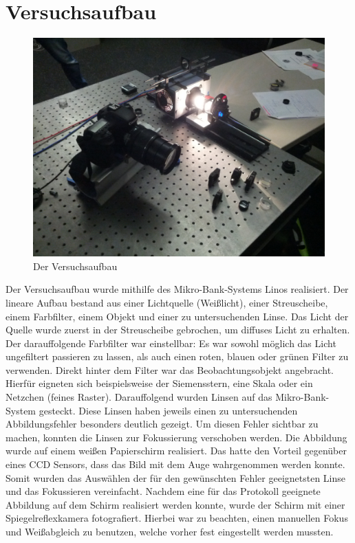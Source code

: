 \section{Versuchsaufbau}

\begin{figure}[h!]
	\includegraphics[width=\linewidth]{img/Versuchsaufbau}
	\caption{Der Versuchsaufbau}
	\label{fig:versuchsaufbau}
\end{figure}

Der Versuchsaufbau wurde mithilfe des Mikro-Bank-Systems Linos realisiert. Der lineare Aufbau bestand aus einer Lichtquelle (Weißlicht), einer Streuscheibe, einem Farbfilter, einem Objekt und einer zu untersuchenden Linse. \newline 
Das Licht der Quelle wurde zuerst in der Streuscheibe gebrochen, um diffuses Licht zu erhalten. Der darauffolgende Farbfilter war einstellbar: Es war sowohl möglich das Licht ungefiltert passieren zu lassen, als auch einen roten, blauen oder grünen Filter zu verwenden. Direkt hinter dem Filter war das Beobachtungsobjekt angebracht. Hierfür eigneten sich beispielsweise der Siemensstern, eine Skala oder ein Netzchen (feines Raster). Darauffolgend wurden Linsen auf das Mikro-Bank-System gesteckt. Diese Linsen haben jeweils einen zu untersuchenden Abbildungsfehler besonders deutlich gezeigt. Um diesen Fehler sichtbar zu machen, konnten die Linsen zur Fokussierung verschoben werden. 
Die Abbildung wurde auf einem weißen Papierschirm realisiert. Das hatte den Vorteil gegenüber eines CCD Sensors, dass das Bild mit dem Auge wahrgenommen werden konnte. Somit wurden das Auswählen der für den gewünschten Fehler geeignetsten Linse und das Fokussieren vereinfacht.
Nachdem eine für das Protokoll geeignete Abbildung auf dem Schirm realisiert werden konnte, wurde der Schirm mit einer Spiegelreflexkamera fotografiert. Hierbei war zu beachten, einen manuellen Fokus und Weißabgleich zu benutzen, welche vorher fest eingestellt werden mussten. 